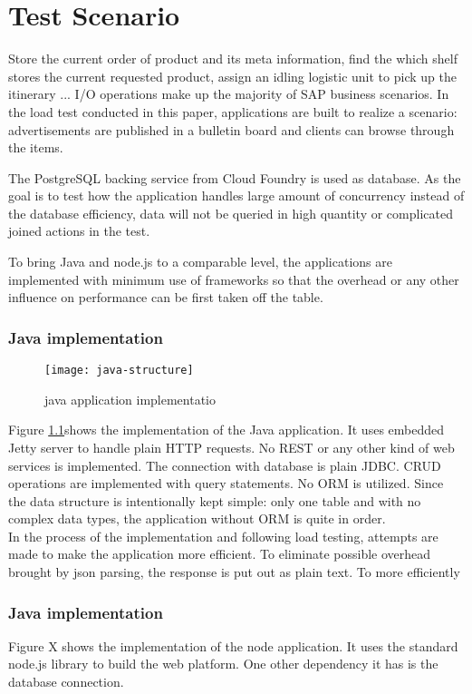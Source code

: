 \chapter{Test Scenario}
Store the current order of product and its meta information, find the which shelf stores the current requested product, assign an idling logistic unit to pick up the itinerary ... I/O operations make up the majority of SAP business scenarios.    
 In the load test conducted in this paper, applications are built to realize a scenario: advertisements are published in a bulletin board and clients can browse through the items. 

The PostgreSQL backing service from Cloud Foundry is used as database. As the goal is to test how the application handles large amount of concurrency instead of the database efficiency, data will not be queried in high quantity or complicated joined actions  in the test. 

To bring Java and node.js to a comparable level, the applications are implemented with minimum use of frameworks so that the overhead or any other influence on performance can be first taken off the table. 
\subsection{Java implementation}
\begin{figure}[h]
	\centering
	\texttt{[image: java-structure]}
	\caption{java application implementatio}
	\label{java-implementation}
\end{figure}
Figure \ref{java-implementation}shows the implementation of the Java application. It uses embedded Jetty server to handle plain HTTP requests. No REST or any other kind of web services is implemented. The connection with database is plain JDBC. CRUD operations are implemented with query statements. No ORM is utilized. Since the data structure is intentionally kept simple: only one table and with no complex data types, the application without ORM is quite in order.\\
In the process of the implementation and following load testing, attempts are made to make the application more efficient. To eliminate possible overhead brought by json parsing, the response is put out as  plain text. To more efficiently 
 \subsection{Java implementation}
Figure X shows the implementation of the node application. It uses the standard node.js library to build the web platform. One other dependency it has is the database connection. 

